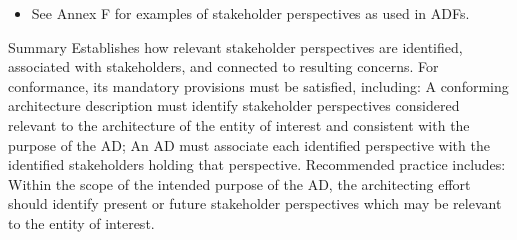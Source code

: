\documentclass[10pt,letterpaper]{article}
\begin{document}
\begin{CornellNotesTable}
{\begin{itemize}[leftmargin=*,nosep,topsep=1pt]
\item See Annex F for examples of stakeholder perspectives as used in ADFs.
\end{itemize}}
\end{CornellNotesTable}


\begin{CornellSummaryBox}{Summary}
Establishes how relevant stakeholder perspectives are identified, associated with stakeholders, and connected to resulting concerns. For conformance, its mandatory provisions must be satisfied, including: A conforming architecture description must identify stakeholder perspectives considered relevant to the architecture of the entity of interest and consistent with the purpose of the AD; An AD must associate each identified perspective with the identified stakeholders holding that perspective. Recommended practice includes: Within the scope of the intended purpose of the AD, the architecting effort should identify present or future stakeholder perspectives which may be relevant to the entity of interest.
\end{CornellSummaryBox}
\end{document}
